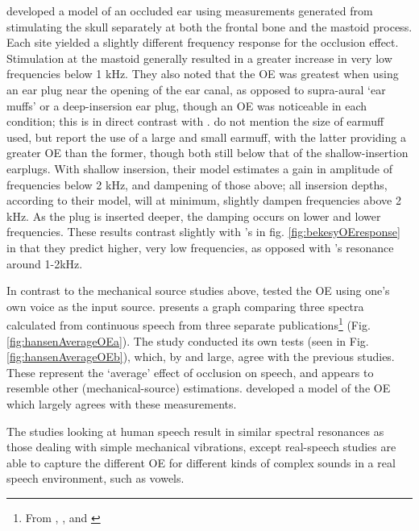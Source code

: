 \documentclass[dissertation,copyright]{uathesis}
\begin{document}
\cite{stenfelt:07} developed a model of an occluded ear using measurements generated from stimulating the skull separately at both the frontal bone and the mastoid process.  Each site yielded a slightly different frequency response for the occlusion effect.  Stimulation at the mastoid generally resulted in a greater increase in very low frequencies below 1 kHz.  They also noted that the OE was greatest when using an ear plug near the opening of the ear canal, as opposed to supra-aural `ear muffs' or a deep-insersion ear plug, though an OE was noticeable in each condition; this is in direct contrast with \cite{dean:00}.  \cite{dean:00} do not mention the size of earmuff used, but \cite{stenfelt:07} report the use of a large and small earmuff, with the latter providing a greater OE than the former, though both still below that of the shallow-insertion earplugs.
With shallow insersion, their model estimates a gain in amplitude of frequencies below 2 kHz, and dampening of those above; all insersion depths, according to their model, will at minimum, slightly dampen frequencies above 2 kHz.  As the plug is inserted deeper, the damping occurs on lower and lower frequencies. These results contrast slightly with \cite{bekesy:60}'s in fig. \ref{fig:bekesyOEresponse} in that they predict higher, very low frequencies, as opposed with \cite{bekesy:60}'s resonance around 1-2kHz.


In contrast to the mechanical source studies above, \cite{hansen:97b} tested the OE using one's own voice as the input source.  \cite{hansen:97b} presents a graph comparing three spectra calculated from continuous speech from three separate publications\footnote{From \cite{wimmer:86}, \cite{thorup:96}, and \cite{may:92}} (Fig. \ref{fig:hansenAverageOEa}).  The study conducted its own tests (seen in Fig. \ref{fig:hansenAverageOEb}), which, by and large, agree with the previous studies.  These represent the `average' effect of occlusion on speech, and appears to resemble other (mechanical-source) estimations.  \cite{hansen:97b} developed a model of the OE which largely agrees with these measurements.

The studies looking at human speech result in similar spectral resonances as those dealing with simple mechanical vibrations, except real-speech studies are able to capture the different OE for different kinds of complex sounds in a real speech environment, such as vowels.  

\end{document}

